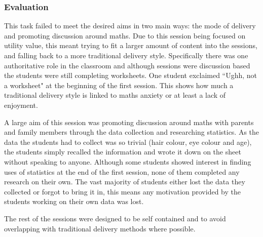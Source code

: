 \documentclass[11pt, a4paper, notitlepage]{article}
\begin{document}
\subsubsection*{Evaluation}
This task failed to meet the desired aims in two main ways: the mode of delivery and promoting discussion around maths. Due to this session being focused on utility value, this meant trying to fit a larger amount of content into the sessions, and falling back to a more traditional delivery style. Specifically there was one authoritative role in the classroom and although sessions were discussion based the students were still completing worksheets. One student exclaimed ``Ughh, not a worksheet" at the beginning of the first session. This shows how much a traditional delivery style is linked to maths anxiety or at least a lack of enjoyment.
\par
A large aim of this session was promoting discussion around maths with parents and family members through the data collection and researching statistics. As the data the students had to collect was so trivial (hair colour, eye colour and age), the students simply recalled the information and wrote it down on the sheet without speaking to anyone. Although some students showed interest in finding uses of statistics at the end of the first session, none of them completed any research on their own. The vast majority of students either lost the data they collected or forgot to bring it in, this means any motivation provided by the students working on their own data was lost.
\par
The rest of the sessions were designed to be self contained and to avoid overlapping with traditional delivery methods where possible.
\end{document}
